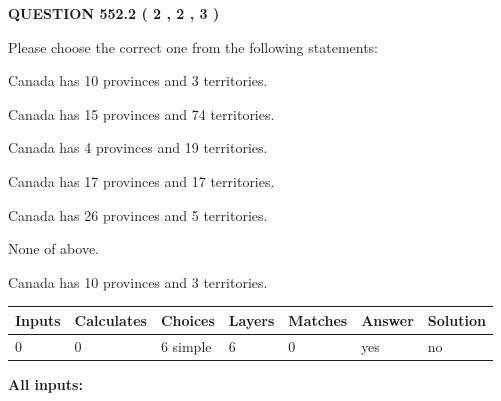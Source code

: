 \documentclass[12pt]{article}
\begin{document}
   
  
\vspace{0.2in}
  
{\textbf{\Large{QUESTION
552.2 
 ( 2 , 2 , 3 )
}}}
  
  
Please choose the correct one from the following statements:
 
 
Canada has 10  provinces and 3 territories.
 
 
Canada has  15 provinces and  74 territories.
 
 
Canada has   4 provinces and  19 territories.
 
 
Canada has  17 provinces and  17 territories.
 
 
Canada has  26 provinces and  5 territories.
 
 
 None of above.
 
 
\noindent{}
 
 
Canada has 10  provinces and 3 territories.
 
 
\noindent{}
 
 
   
   
   
   
\noindent\begin{tabular}{|l|l|l|l|l|l|l|}
 \hline
Inputs & Calculates & Choices & Layers & Matches & Answer & Solution \\ \hline
 0  & 
 0  & 
 6
  simple  
  & 
 6  & 
 0  & 
  yes & 
  no 
  \\ \hline
 \end{tabular}
   
   
   
   
\noindent{}
   
   
   
   
\noindent\vspace{0.1in}\hspace{-0.08in} {\textbf{\Large{All inputs: }}}
   
   
   
   
   
   
 \vspace{0.2in}
 
\end{document}
